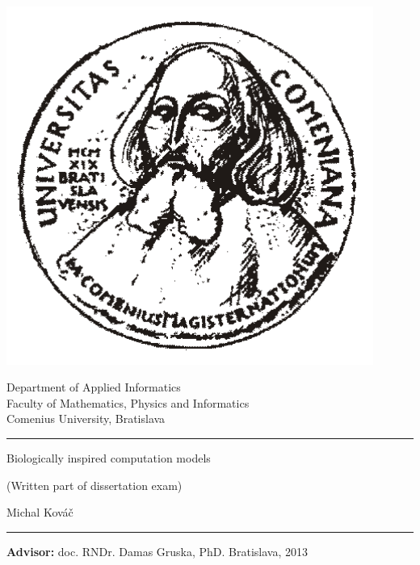 \documentclass[12pt,oneside,openany,pagenumber=footcenter]{book}
\def\mftitlea{Biologically inspired computation models}
\def\mfthesistype{Written part of dissertation exam}
\def\mfauthor{Michal Kováč}
\def\mfadvisor{doc. RNDr. Damas Gruska, PhD.}
\def\mfplacedate{Bratislava, 2013}
\begin{document}
\frontmatter
\thispagestyle{empty}
\begin{minipage}{0.20\textwidth}
\includegraphics[width=0.9\textwidth]{img/comenius_half.png}
\end{minipage}
\begin{minipage}{0.79\textwidth}
\begin{center}
\sc Department of Applied Informatics \\
Faculty of Mathematics, Physics and Informatics \\
Comenius University, Bratislava
\end{center}
\end{minipage}

\vfill
\begin{center}
\begin{minipage}{0.8\textwidth}
\hrule
\bigskip\bigskip
\centerline{\LARGE\sc\mftitlea}
\smallskip
\centerline{(\mfthesistype)}
\bigskip
\bigskip
\centerline{\large\sc\mfauthor}
\bigskip\bigskip
\hrule
\end{minipage}
\end{center}
\vfill
{\bf Advisor:} \mfadvisor
\hfill\mfplacedate
\eject
\eject

\thispagestyle{empty}
{~}\vspace{12cm}




\tableofcontents{}
\listoffigures{}

\mainmatter
\end{document}
